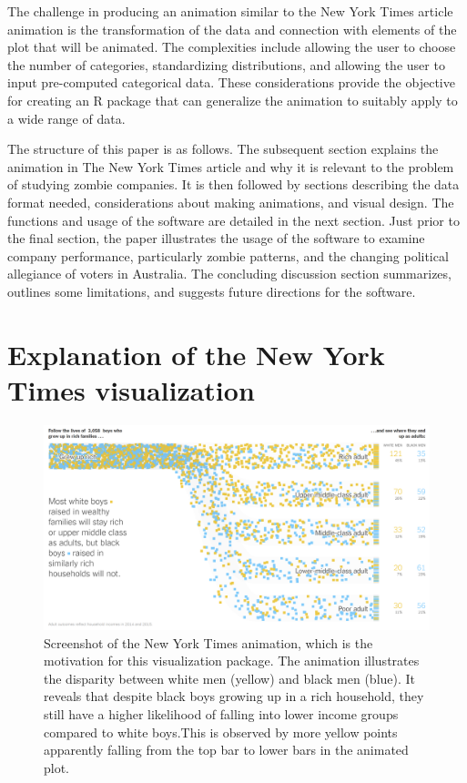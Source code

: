 The challenge in producing an animation similar to the New York Times article animation is the transformation of the data and connection with elements of the plot that will be animated. The complexities include allowing the user to choose the number of categories, standardizing distributions, and allowing the user to input pre-computed categorical data. These considerations provide the objective for creating an R package that can generalize the animation to suitably apply to a wide range of data.

The structure of this paper is as follows. The subsequent section explains the animation in The New York Times article and why it is relevant to the problem of studying zombie companies. It is then followed by sections describing the data format needed, considerations about making animations, and visual design. The functions and usage of the software are detailed in the next section. Just prior to the final section, the paper illustrates the usage of the software to examine company performance, particularly zombie patterns, and the changing political allegiance of voters in Australia. The concluding discussion section summarizes, outlines some limitations, and suggests future directions for the software.

\section{Explanation of the New York Times visualization}\label{NYTvis}

\begin{figure}

{\centering \includegraphics[width=1\linewidth]{figures/NYT} 

}

\caption{Screenshot of the New York Times animation, which is the motivation for this visualization package. The animation illustrates the disparity between white men (yellow) and black men (blue). It reveals that despite black boys growing up in a rich household, they still have a higher likelihood of falling into lower income groups compared to white boys.This is observed by more yellow points apparently falling from the top bar to lower bars in the animated plot.}\label{fig:nyt}
\end{figure}

